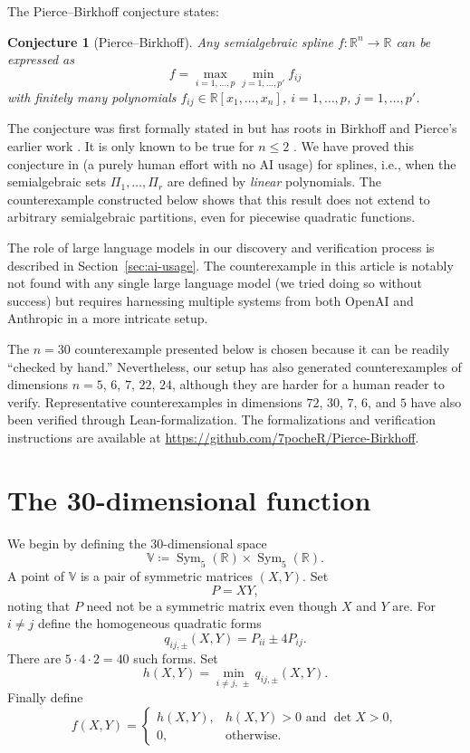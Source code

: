 \documentclass[11pt]{amsart}
\newtheorem{conjecture}[theorem]{Conjecture}
\theoremstyle{remark}
\DeclareMathOperator{\Sym}{Sym}
\begin{document}
The Pierce--Birkhoff conjecture states:
\begin{conjecture}[Pierce--Birkhoff]\label{conj:PB}
Any semialgebraic spline $f : \mathbb{R}^n \to \mathbb{R}$ can be expressed as
\begin{equation}\label{eq:PB}
f=\max_{i=1,\dots,p}\min_{j=1,\dots,p'} f_{ij}
\end{equation}
with finitely many polynomials $f_{ij} \in \mathbb{R}[x_1,\dots,x_n]$, $i =1,\dots,p$, $j=1,\dots,p'$.
\end{conjecture}
The conjecture was first formally stated in  \cite{HI} but has roots in Birkhoff and Pierce's earlier work \cite{BP}. It is only known to be true for $n \le 2$ \cite{Mahe1984}. We have proved this conjecture in \cite{LL} (a purely human effort with no AI usage) for splines, i.e., when the semialgebraic sets $\Pi_1,\dots,\Pi_r$ are defined by \emph{linear} polynomials. The counterexample constructed below shows that this result does not extend to arbitrary semialgebraic partitions, even for piecewise quadratic functions.

The role of large language models in our discovery and verification process is described in Section~\ref{sec:ai-usage}. The counterexample in this article is notably not found with any single large language model (we tried doing so without success) but requires harnessing multiple systems from both OpenAI and Anthropic in a more intricate setup.

The $n = 30$ counterexample presented below is chosen because it can be readily ``checked by hand.'' Nevertheless, our setup has also generated counterexamples of dimensions $n = 5$, $6$, $7$, $22$, $24$, although they are harder for a human reader to verify. Representative counterexamples in dimensions $72$, $30$, $7$, $6$, and $5$ have also been verified through Lean-formalization. The formalizations and verification instructions are available at \url{https://github.com/7pocheR/Pierce-Birkhoff}.



\section{The 30-dimensional function}

We begin by defining the $30$-dimensional space
\[
\mathbb{V} \coloneqq \Sym_5(\mathbb R)\times\Sym_5(\mathbb R).
\]
A point of $\mathbb{V}$ is a pair of symmetric matrices $(X,Y)$. Set
\[
P=XY,
\]
noting that $P$ need not be a symmetric matrix even though $X$ and $Y$ are. For $i\ne j$ define the homogeneous quadratic forms
\[
q_{ij,\pm}(X,Y)=P_{ii}\pm 4 P_{ij}.
\]
There are $5\cdot4\cdot2=40$ such forms. Set
\[
h(X,Y)=\min_{i\ne j,\, \pm}q_{ij, \pm}(X,Y).
\]
Finally define
\begin{equation}\label{eq:counterexample}
f(X,Y)=
\begin{cases}
h(X,Y),& h(X,Y)>0\text{ and }\det X>0,\\[2mm]
0,&\text{otherwise}.
\end{cases}
\end{equation}
\end{document}
